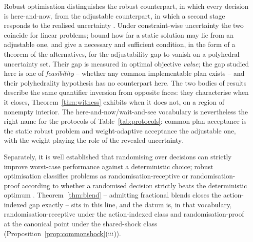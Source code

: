 Robust optimisation distinguishes the robust counterpart, in which every decision is here-and-now, from the adjustable counterpart, in which a second stage responds to the realised uncertainty \citep{BenTal2004,BenTal2009}. Under constraint-wise uncertainty the two coincide for linear problems; \citet{BertsimasGoyal2010} bound how far a static solution may lie from an adjustable one, and \citet{WeiZhang2024} give a necessary and sufficient condition, in the form of a theorem of the alternatives, for the adjustability gap to vanish on a polyhedral uncertainty set. Their gap is measured in optimal objective \emph{value}; the gap studied here is one of \emph{feasibility} -- whether any common implementable plan exists -- and their polyhedrality hypothesis has no counterpart here. The two bodies of results describe the same quantifier inversion from opposite faces: they characterise when it closes, Theorem~\ref{thm:witness} exhibits when it does not, on a region of nonempty interior. The here-and-now/wait-and-see vocabulary is nevertheless the right name for the protocols of Table~\ref{tab:protocols}: common-plan acceptance is the static robust problem and weight-adaptive acceptance the adjustable one, with the weight playing the role of the revealed uncertainty.

Separately, it is well established that randomising over decisions can strictly improve worst-case performance against a deterministic choice; robust optimisation classifies problems as randomisation-receptive or randomisation-proof according to whether a randomised decision strictly beats the deterministic optimum \citep{Delage2019,KrauseRoperGolovin2011,VorobeychikLi2014,Sinha2018,Sessa2020}. Theorem~\ref{thm:blend} -- admitting fractional blends closes the action-indexed gap exactly -- sits in this line, and the datum is, in that vocabulary, randomisation-receptive under the action-indexed class and randomisation-proof at the canonical point under the shared-shock class (Proposition~\ref{prop:commonshock}(iii)).

